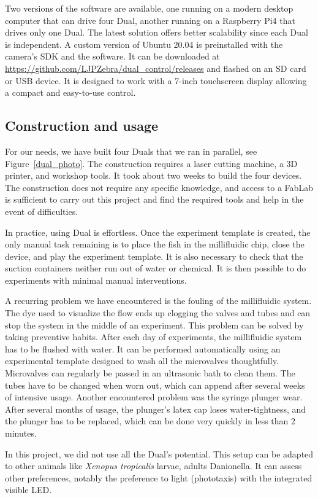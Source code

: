   Two versions of the software are available, one running on a modern desktop computer that can drive four Dual, another running on a Raspberry Pi4 that drives only one Dual. The latest solution offers better scalability since each Dual is independent. A custom version of Ubuntu 20.04 is preinstalled with the camera's SDK and the software. It can be downloaded at \url{https://github.com/LJPZebra/dual_control/releases} and flashed on an SD card or USB device. It is designed to work with a 7-inch touchscreen display allowing a compact and easy-to-use control.

  \subsection{Construction and usage}
  For our needs, we have built four Duals that we ran in parallel, see Figure~\ref{dual_photo}. The construction requires a laser cutting machine, a 3D printer, and workshop tools. It took about two weeks to build the four devices. The construction does not require any specific knowledge, and access to a FabLab is sufficient to carry out this project and find the required tools and help in the event of difficulties.

  In practice, using Dual is effortless. Once the experiment template is created, the only manual task remaining is to place the fish in the millifluidic chip, close the device, and play the experiment template. It is also necessary to check that the suction containers neither run out of water or chemical. It is then possible to do experiments with minimal manual interventions.

  A recurring problem we have encountered is the fouling of the millifluidic system. The dye used to visualize the flow ends up clogging the valves and tubes and can stop the system in the middle of an experiment. This problem can be solved by taking preventive habits. After each day of experiments, the millifluidic system has to be flushed with water. It can be performed automatically using an experimental template designed to wash all the microvalves thoughtfully. Microvalves can regularly be passed in an ultrasonic bath to clean them. The tubes have to be changed when worn out, which can append after several weeks of intensive usage. Another encountered problem was the syringe plunger wear. After several months of usage, the plunger's latex cap loses water-tightness, and the plunger has to be replaced, which can be done very quickly in less than 2 minutes.

  In this project, we did not use all the Dual's potential. This setup can be adapted to other animals like \textit{Xenopus tropicalis} larvae, adults Danionella. It can assess other preferences, notably the preference to light (phototaxis) with the integrated visible LED.

